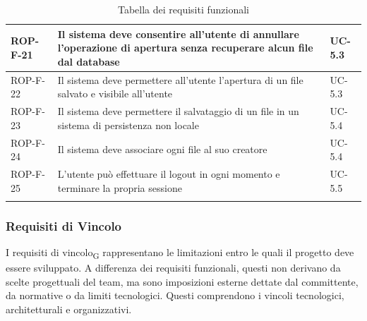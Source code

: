 \documentclass[11pt,a4paper]{article}
\begin{document}
\begin{longtable}{|p{}|>{\raggedright\arraybackslash}p{}|p{}|}
\hline
ROP-F-21 & Il sistema deve consentire all'utente di annullare l'operazione di apertura senza recuperare alcun file dal database & UC-5.3 \\
\hline
ROP-F-22 & Il sistema deve permettere all'utente l'apertura di un file salvato e visibile all'utente & UC-5.3 \\
\hline
ROP-F-23 & Il sistema deve permettere il salvataggio di un file in un sistema di persistenza non locale & UC-5.4 \\
\hline
ROP-F-24 & Il sistema deve associare ogni file al suo creatore & UC-5.4 \\
\hline
ROP-F-25 & L'utente può effettuare il logout in ogni momento e terminare la propria sessione & UC-5.5 \\
\hline

\addlinespace[1em]
\caption{Tabella dei requisiti funzionali}
\end{longtable}

\newpage
\subsubsection{Requisiti di Vincolo}
I requisiti di vincolo\textsubscript{G} rappresentano le limitazioni entro le quali il progetto deve essere sviluppato. A differenza dei requisiti funzionali, questi non derivano da scelte progettuali del team, ma sono imposizioni esterne dettate dal committente, da normative o da limiti tecnologici.
Questi comprendono i vincoli tecnologici, architetturali e organizzativi.
\end{document}

